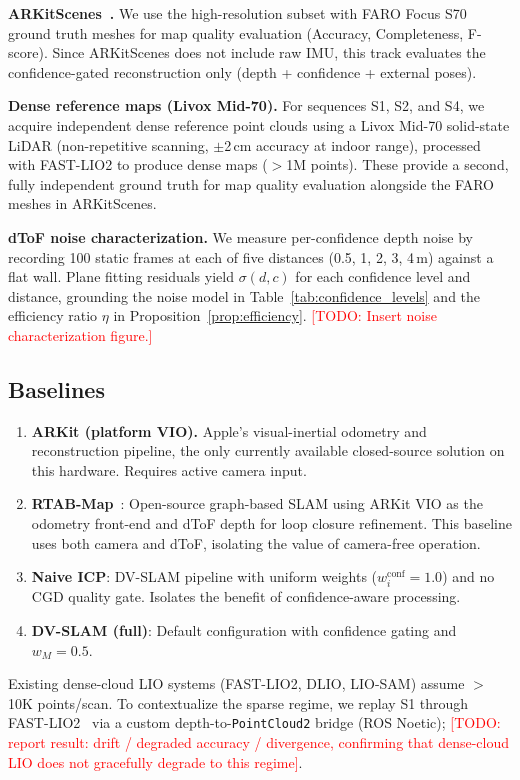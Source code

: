 \documentclass[journal]{IEEEtran}
\newcommand{\todo}[1]{\textcolor{red}{[TODO: #1]}}
\begin{document}
\textbf{ARKitScenes~\cite{baruch2021arkitscenes}.}
We use the high-resolution subset with FARO Focus S70 ground truth meshes for map quality evaluation (Accuracy, Completeness, F-score). Since ARKitScenes does not include raw IMU, this track evaluates the confidence-gated reconstruction only (depth + confidence + external poses).

\textbf{Dense reference maps (Livox Mid-70).}
For sequences S1, S2, and S4, we acquire independent dense reference point clouds using a Livox Mid-70 solid-state LiDAR (non-repetitive scanning, $\pm$2\,cm accuracy at indoor range), processed with FAST-LIO2 to produce dense maps ($>$1M points). These provide a second, fully independent ground truth for map quality evaluation alongside the FARO meshes in ARKitScenes.

\textbf{dToF noise characterization.}
We measure per-confidence depth noise by recording 100 static frames at each of five distances (0.5, 1, 2, 3, 4\,m) against a flat wall. Plane fitting residuals yield $\sigma(d, c)$ for each confidence level and distance, grounding the noise model in Table~\ref{tab:confidence_levels} and the efficiency ratio $\eta$ in Proposition~\ref{prop:efficiency}. \todo{Insert noise characterization figure.}

\subsection{Baselines}
\label{sec:baselines}

\begin{enumerate}
    \item \textbf{ARKit (platform VIO).} Apple's visual-inertial odometry and reconstruction pipeline, the only currently available closed-source solution on this hardware. Requires active camera input.
    \item \textbf{RTAB-Map}~\cite{labbe2019rtabmap}: Open-source graph-based SLAM using ARKit VIO as the odometry front-end and dToF depth for loop closure refinement. This baseline uses both camera and dToF, isolating the value of camera-free operation.
    \item \textbf{Naive ICP}: DV-SLAM pipeline with uniform weights ($w_i^{\text{conf}} = 1.0$) and no CGD quality gate. Isolates the benefit of confidence-aware processing.
    \item \textbf{DV-SLAM (full)}: Default configuration with confidence gating and $w_M = 0.5$.
\end{enumerate}
Existing dense-cloud LIO systems (FAST-LIO2, DLIO, LIO-SAM) assume $>$10K points/scan. To contextualize the sparse regime, we replay S1 through FAST-LIO2~\cite{xu2022fastlio2} via a custom depth-to-\texttt{PointCloud2} bridge (ROS Noetic); \todo{report result: drift / degraded accuracy / divergence, confirming that dense-cloud LIO does not gracefully degrade to this regime}.
\end{document}
